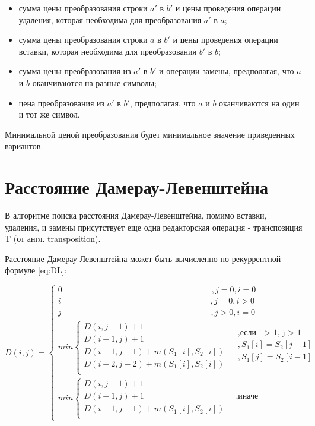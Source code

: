 \documentclass[a4paper,14pt, unknownkeysallowed]{extreport}
\begin{document}
\begin{itemize}
	\item сумма цены преобразования строки $a'$ в $b'$ и цены проведения операции удаления, которая необходима для преобразования $a'$ в $a$;
	\item сумма цены преобразования строки $a$ в $b'$ и цены проведения операции вставки, которая необходима для преобразования $b'$ в $b$;
	\item сумма цены преобразования из $a'$ в $b'$ и операции замены, предполагая, что $a$ и $b$ оканчиваются на разные символы;
	\item цена преобразования из $a'$ в $b'$, предполагая, что $a$ и $b$ оканчиваются на один и тот же символ.
\end{itemize}

Минимальной ценой преобразования будет минимальное значение приведенных вариантов.

\section{Расстояние Дамерау-Левенштейна}

В алгоритме поиска расстояния Дамерау-Левенштейна, помимо вставки, удаления, и замены присутствует  еще одна редакторская операция - транспозиция T (от англ. transposition).

Расстояние Дамерау-Левенштейна может быть вычисленно по рекуррентной формуле \ref{eq:DL}:

\begin{equation}
	\label{eq:DL}
	D(i, j) = \begin{cases}
	0 \qquad\qquad\qquad\qquad\qquad\qquad\qquad\qquad\qquad ,j = 0, i = 0\\
	i \qquad\qquad\qquad\qquad\qquad\qquad\qquad\qquad\qquad ,j = 0, i > 0\\
	j \qquad\qquad\qquad\qquad\qquad\qquad\qquad\qquad\qquad ,j > 0, i = 0\\
	min \begin{cases}
		D(i, j - 1) + 1\\
		D(i - 1, j) + 1\\
		D(i - 1, j - 1) + m(S_{1}[i], S_{2}[i]) \\
		D(i - 2, j - 2) + m(S_{1}[i], S_{2}[i]) \\
	\end{cases}
	\begin{aligned}
		& , \text{если i > 1, j > 1} \\
		& , S_{1}[i] = S_{2}[j - 1]  \\
		& , S_{1}[j] =  S_{2}[i - 1] \\
	\end{aligned}\\
	min \begin{cases}
		D(i, j - 1) + 1\\
		D(i - 1, j) + 1 & \;\; \text{,иначе}\\
		D(i - 1, j - 1) + m(S_{1}[i], S_{2}[i]) \\
	\end{cases}
	\end{cases}
\end{equation}
	    
\end{document}
